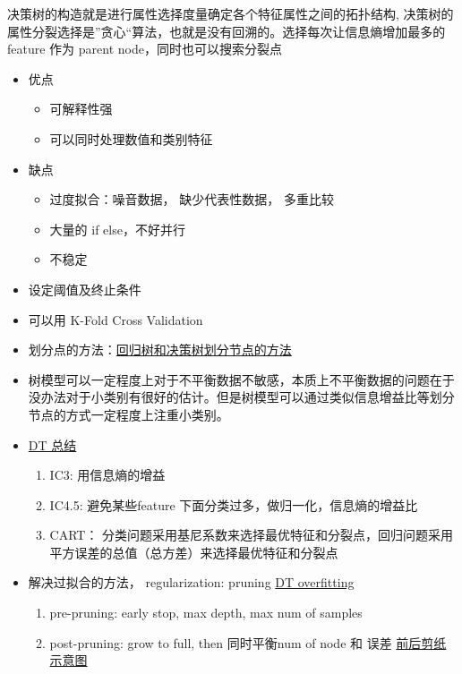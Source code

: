 \documentclass[12pt]{article}
\numberwithin{theorem}{section} %
\numberwithin{definition}{section} %
\numberwithin{assumption}{section} %
\numberwithin{lemma}{section} %
\numberwithin{remark}{section} %
\numberwithin{prop}{section} %
\numberwithin{corollary}{section} %
\numberwithin{example}{section} %
\numberwithin{question}{section} %
\numberwithin{problem}{section} %
\numberwithin{conjecture}{section} %
\numberwithin{append}{section} %
\numberwithin{property}{section} %
\begin{document}
\begin{CJK}{UTF8}{gbsn}
决策树的构造就是进行属性选择度量确定各个特征属性之间的拓扑结构, 决策树的属性分裂选择是”贪心“算法，也就是没有回溯的。选择每次让信息熵增加最多的 feature 作为 parent node，同时也可以搜索分裂点
\begin{itemize}
	\item 优点
	\begin{itemize}
		\item 可解释性强
		\item 可以同时处理数值和类别特征
	\end{itemize}
	\item 缺点
	\begin{itemize}
		\item 过度拟合：噪音数据， 缺少代表性数据， 多重比较
		\item 大量的 if else，不好并行
		\item 不稳定
	\end{itemize}
\end{itemize}
\begin{itemize}
	\item 设定阈值及终止条件
	\item 可以用 K-Fold Cross Validation
	\item 划分点的方法：\href{https://blog.csdn.net/zhihua_oba/article/details/72230427}{回归树和决策树划分节点的方法}
	\item 树模型可以一定程度上对于不平衡数据不敏感，本质上不平衡数据的问题在于没办法对于小类别有很好的估计。但是树模型可以通过类似信息增益比等划分节点的方式一定程度上注重小类别。
	\item \href{https://zhuanlan.zhihu.com/p/341598480}{DT 总结}
	\begin{enumerate}
		\item IC3: 用信息熵的增益
		\item IC4.5: 避免某些feature 下面分类过多，做归一化，信息熵的增益比
		\item CART： 分类问题采用基尼系数来选择最优特征和分裂点，回归问题采用平方误差的总值（总方差）来选择最优特征和分裂点
	\end{enumerate}
	\item 解决过拟合的方法， regularization: pruning \href{https://towardsdatascience.com/3-techniques-to-avoid-overfitting-of-decision-trees-1e7d3d985a09}{DT overfitting}
	\begin{enumerate}
		\item pre-pruning: early stop, max depth, max num of samples
		\item post-pruning: grow to full, then 同时平衡num of node 和 误差 \href{https://www.cnblogs.com/shayue/p/jue-ce-shu-fang-zhi-guo-ni-he.html}{前后剪纸示意图}
	\end{enumerate}
\end{itemize}


\end{CJK}
\end{document}
